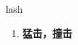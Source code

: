 
\begin{frame}
{\huge lash}
\begin{center}
\begin{enumerate}\Large
  \item \textbf{猛击，撞击}
\end{enumerate}
\end{center}
\end{frame}
